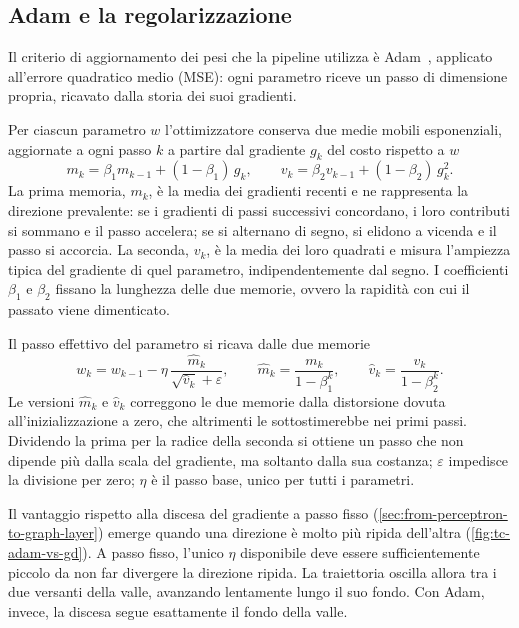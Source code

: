 \subsection{Adam e la regolarizzazione}

Il criterio di aggiornamento dei pesi che la pipeline utilizza è Adam~\cite{kingmaba2015adam}, applicato all'errore quadratico medio (MSE): ogni parametro riceve un passo di dimensione propria, ricavato dalla storia dei suoi gradienti.

Per ciascun parametro $w$ l'ottimizzatore conserva due medie mobili esponenziali, aggiornate a ogni passo $k$ a partire dal gradiente $g_k$ del costo rispetto a $w$
\begin{equation}
\label{eq:adam-moments}
m_k = \beta_1 m_{k-1} + (1-\beta_1)\,g_k, \qquad v_k = \beta_2 v_{k-1} + (1-\beta_2)\,g_k^2.
\end{equation}
La prima memoria, $m_k$, è la media dei gradienti recenti e ne rappresenta la direzione prevalente: se i gradienti di passi successivi concordano, i loro contributi si sommano e il passo accelera; se si alternano di segno, si elidono a vicenda e il passo si accorcia. La seconda, $v_k$, è la media dei loro quadrati e misura l'ampiezza tipica del gradiente di quel parametro, indipendentemente dal segno. I coefficienti $\beta_1$ e $\beta_2$ fissano la lunghezza delle due memorie, ovvero la rapidità con cui il passato viene dimenticato.

Il passo effettivo del parametro si ricava dalle due memorie
\begin{equation}
\label{eq:adam-update}
w_k = w_{k-1} - \eta\,\frac{\hat m_k}{\sqrt{\hat v_k}+\varepsilon}, \qquad \hat m_k = \frac{m_k}{1-\beta_1^k}, \qquad \hat v_k = \frac{v_k}{1-\beta_2^k}.
\end{equation}
Le versioni $\hat m_k$ e $\hat v_k$ correggono le due memorie dalla distorsione dovuta all'inizializzazione a zero, che altrimenti le sottostimerebbe nei primi passi. Dividendo la prima per la radice della seconda si ottiene un passo che non dipende più dalla scala del gradiente, ma soltanto dalla sua costanza; $\varepsilon$ impedisce la divisione per zero; $\eta$ è il passo base, unico per tutti i parametri.

Il vantaggio rispetto alla discesa del gradiente a passo fisso (\cref{sec:from-perceptron-to-graph-layer}) emerge quando una direzione è molto più ripida dell'altra (\cref{fig:tc-adam-vs-gd}). A passo fisso, l'unico $\eta$ disponibile deve essere sufficientemente piccolo da non far divergere la direzione ripida. La traiettoria oscilla allora tra i due versanti della valle, avanzando lentamente lungo il suo fondo. Con Adam, invece, la discesa segue esattamente il fondo della valle.


